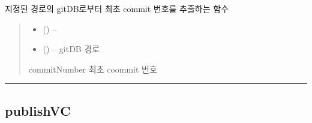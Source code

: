 \documentclass[a4paper,10pt,english]{sphinxmanual}
\begin{document}
\begin{fulllineitems}
\begin{fulllineitems}
\begin{quote}
\begin{description}
\end{description}\end{quote}

\end{fulllineitems}


\begin{fulllineitems}
\label{\detokenize{_VersionController:VC.returnFirstCommit}}
\pysigstartsignatures
{}
\pysigstopsignatures
\sphinxAtStartPar
지정된 경로의 gitDB로부터 최초 commit 번호를 추출하는 함수
\begin{quote}\begin{description}
\begin{itemize}
\item {} 
\sphinxAtStartPar
{} ({\hyperref[\detokenize{_VersionController:VC}]{}}) – 

\item {} 
\sphinxAtStartPar
{} () – gitDB 경로

\end{itemize}

\sphinxAtStartPar
commitNumber \sphinxhyphen{} 최초 coommit 번호

\end{description}\end{quote}

\end{fulllineitems}


\end{fulllineitems}



\bigskip\hrule\bigskip



\subsection{publishVC}
\label{\detokenize{_VersionController:publishvc}}
\end{document}
